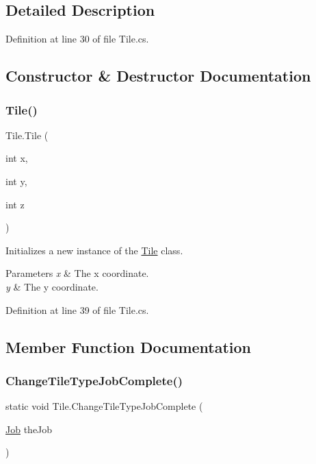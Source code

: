 \subsection{Detailed Description}


Definition at line 30 of file Tile.\+cs.



\subsection{Constructor \& Destructor Documentation}
\mbox{\label{class_tile_aa35a3149e656433f826c5b4a8c45fd71}} 
\subsubsection{\texorpdfstring{Tile()}{Tile()}}
{\footnotesize\ttfamily Tile.\+Tile (\begin{DoxyParamCaption}\item[{int}]{x,  }\item[{int}]{y,  }\item[{int}]{z }\end{DoxyParamCaption})}



Initializes a new instance of the \hyperlink{class_tile}{Tile} class. 


\begin{DoxyParams}{Parameters}
{\em x} & The x coordinate.\\
\hline
{\em y} & The y coordinate.\\
\hline
\end{DoxyParams}


Definition at line 39 of file Tile.\+cs.



\subsection{Member Function Documentation}
\mbox{\label{class_tile_a6e49ff8d44f3f2d0ae06370db9c7db21}} 
\subsubsection{\texorpdfstring{Change\+Tile\+Type\+Job\+Complete()}{ChangeTileTypeJobComplete()}}
{\footnotesize\ttfamily static void Tile.\+Change\+Tile\+Type\+Job\+Complete (\begin{DoxyParamCaption}\item[{\hyperlink{class_job}{Job}}]{the\+Job }\end{DoxyParamCaption})\hspace{0.3cm}{\ttfamily [static]}}



